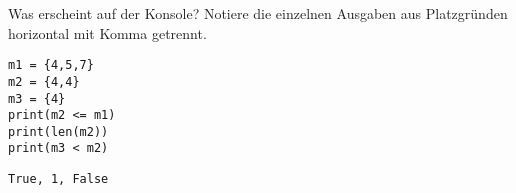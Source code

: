 \question[3] Was erscheint auf der Konsole?
 Notiere die einzelnen Ausgaben aus Platzgründen horizontal mit Komma getrennt.
\begin{lstlisting}
m1 = {4,5,7}
m2 = {4,4}
m3 = {4}
print(m2 <= m1)
print(len(m2))
print(m3 < m2)
\end{lstlisting}
\begin{solutionbox}{2cm}
\texttt{True, 1, False}
\end{solutionbox}
